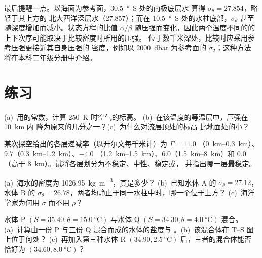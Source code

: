 最后提醒一点。以海面为参考面，\qty{30.5}{\degree S} 处的南极底层水
算得 $\sigma_\theta = 27.854$，略轻于其上方的
北大西洋深层水（\num{27.857}）；而在 \qty{10.5}{\degree S} 处的水柱底部，$\sigma_\theta$
甚至随深度增加而减小。状态方程的比值 $\alpha/\beta$
随压强而变化，因此两个温度不同的的
上下次序可能取决于比较密度时所用的压强。
位于数千米深处，比较时应采用参考压强更接近其自身压强的
密度，例如以 \qty{2000}{dbar} 为参考面的 $\sigma_2$；这种方法
将在本科二年级分册中介绍。

\section{练习}

\begin{exercise}[$\star$]\label{exo:b1:fluid-envelopes-structure:1}
(a)~用的常数，计算 \qty{250}{K} 时空气的标高。
(b)~在该温度的等温层中，压强在 \qty{10}{km} 内
降为原来的几分之一？(c)~为什么对流层顶处的标高
比地面处的小？
\end{exercise}

\begin{exercise}[$\star$]\label{exo:b1:fluid-envelopes-structure:2}
某次探空给出的各层递减率（以开尔文每千米计）为 $\Gamma = 11.0$
（\qtyrange{0}{0.3}{km}）、$9.7$（\qtyrange{0.3}{1.2}{km}）、$-4.0$
（\qtyrange{1.2}{1.5}{km}）、$6.0$（\qtyrange{1.5}{8}{km}）和 $0.0$（高于
\qty{8}{km}）。试将各层划分为不稳定、中性、稳定或，
并指出哪一层最稳定。
\end{exercise}

\begin{exercise}[$\star$]\label{exo:b1:fluid-envelopes-structure:3}
(a)~海水的密度为 \qty{1026.95}{kg.m^{-3}}，其是多少？
(b)~已知水体 A 的 $\sigma_\theta = 27.12$，
水体 B 的 $\sigma_\theta = 26.78$，两者均静止于同一水柱中时，哪一个位于上方？
(c)~海洋学家为何用 $\sigma$ 而不用 $\rho$？
\end{exercise}

\begin{exercise}[$\star$]\label{exo:b1:fluid-envelopes-structure:4}
水体 P $(S = 35.40, \theta = \qty{15.0}{\celsius})$ 与水体 Q $(S =
34.30, \theta = \qty{4.0}{\celsius})$ 混合。(a)~计算由一份 P 与三份 Q 混合而成的水体的盐度与
。(b)~该混合体在 T--S 图上位于何处？
(c)~再加入第三种水体 R $(34.90,
\qty{2.5}{\celsius})$ 后，三者的混合体能否
恰好为 $(34.60, \qty{8.0}{\celsius})$？
\end{exercise}


